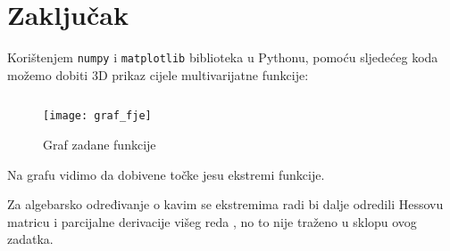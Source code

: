 \chapter{Zaključak}

Korištenjem \verb|numpy| i \verb|matplotlib| biblioteka u Pythonu, pomoću sljedećeg koda možemo dobiti 3D prikaz cijele multivarijatne funkcije:

\inputminted{python}{./code/graf_fje.py}

\begin{figure}[!htb]
    \centering
    \texttt{[image: graf\_fje]}
    \caption{Graf zadane funkcije}
\end{figure}

Na grafu vidimo da dobivene točke jesu ekstremi funkcije.\par
Za algebarsko određivanje o kavim se ekstremima radi bi dalje odredili Hessovu matricu i parcijalne derivacije višeg reda \cite[][poglavlje 6.3]{ccalc}, no to nije traženo u sklopu ovog zadatka.

\newpage